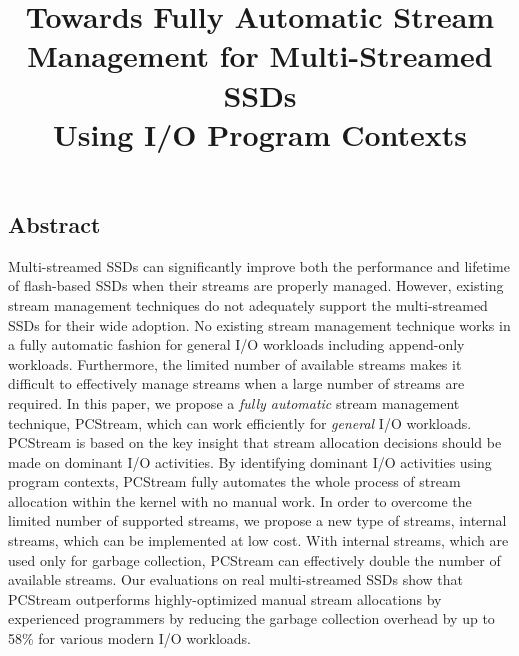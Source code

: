 \documentclass[letterpaper, twocolumn, 10pt]{article}
\begin{document}
\title{
\bf Towards Fully Automatic Stream Management for Multi-Streamed SSDs \\ Using I/O Program Contexts}

%


\maketitle
\pagestyle{empty}
\subsection*{Abstract}
Multi-streamed SSDs
can significantly improve both the performance and lifetime of flash-based SSDs
when their streams are properly managed.  
However, existing stream management techniques do not adequately 
support the multi-streamed SSDs for their wide adoption.
No existing stream management technique works in a fully automatic fashion 
for general I/O workloads including append-only workloads.  
Furthermore, the limited number of available
streams makes it difficult to effectively manage streams 
when a large number of streams are required.
In this paper, we propose a {\it fully automatic} stream
management technique, PCStream, which can work efficiently for {\it general} I/O workloads.
PCStream is based on the key insight that stream allocation decisions should be made on 
dominant I/O activities. By identifying dominant I/O activities using program contexts, 
PCStream fully automates the whole process of stream allocation 
within the kernel with no manual work.
In order to overcome the limited number of supported streams, we propose a new 
type of streams, internal streams, which can be implemented at low cost.
With internal streams, which are used only for garbage collection, 
PCStream can effectively double the number of available streams. 
Our evaluations on real multi-streamed SSDs show that PCStream
outperforms highly-optimized manual stream allocations by experienced 
programmers by reducing the garbage collection overhead 
by up to 58\% for various modern I/O workloads.










\end{document}
